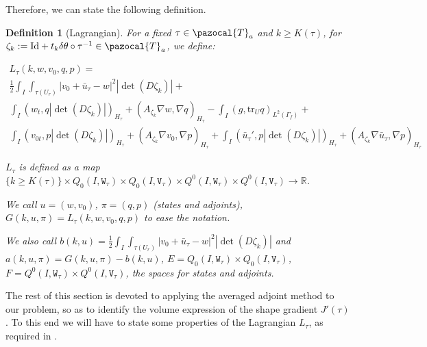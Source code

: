 \documentclass[english,a4paper,10pt,oneside]{scrbook}	%
\theoremstyle{break}
\newtheorem{defn}[equation]{Definition}
\theoremstyle{remark}
\newcommand{\mR}{\mathbb{R}}
\newcommand{\ds}{\displaystyle}
\newcommand{\tr}{\text{tr}}
\newcommand{\cT}{\pazocal{T}}
\newcommand{\id}{\text{Id}}
\newcommand{\te}{\theta}
\newcommand{\tw}[1]{\texttt{#1}}
\begin{document}
Therefore, we can state the following definition.

\begin{defn}[Lagrangian]

For a fixed $\tau \in \cT_a$ and  $k\geq K(\tau)$, for $\zeta_k:=\id+t_k \delta\te \circ \tau^{-1} \in \cT_a$, we define:

\begin{align*}
L_\tau(k,w,v_0,q,p) = \\
\frac{1}{2}\int_I \int_{\tau(U_r)}|v_0+\bar{u}_\tau - w|^2|\det(D\zeta_k)|+\\
\int_I ( w_t , q |\det(D\zeta_k)|)_{H_\tau}+ (A_{\zeta_k}\nabla w, \nabla q)_{H_\tau} -\int_I(g,\tr_{U} q)_{L^2(\Gamma_f)} +\\ \int_I (v_{0t},p |\det(D\zeta_k)|)_{H_\tau} + (A_{\zeta_k} \nabla v_0, \nabla p)_{H_\tau}+\int_I(\bar{u}_\tau',p|\det(D\zeta_k)|)_{H_\tau}+(A_{\zeta_k} \nabla \bar{u}_\tau , \nabla p)_{H_\tau}
\end{align*}

$L_\tau$ is defined as a map $\{k\geq K(\tau)\}\times Q_0(I, \tw{W}_\tau)\times Q_0(I,\tw{V}_\tau)\times Q^0(I, \tw{W}_\tau)\times Q^0(I, \tw{V}_\tau)\rightarrow \mR$.

We call $u = (w,v_0)$, $\pi = (q,p)$ (states and adjoints), $G(k,u,\pi) = L_\tau(k,w,v_0,q,p)$ to ease the notation.

We also call $b(k, u) = \frac{1}{2}\ds\int_I \int_{\tau(U_r)}|v_0+\bar{u}_\tau - w|^2|\det(D\zeta_k)|$ and $a(k, u,\pi) = G(k,u,\pi)-b(k, u)$, $E = Q_0(I, \tw{W}_\tau)\times Q_0(I,\tw{V}_\tau)$, $F=Q^0(I, \tw{W}_\tau)\times Q^0(I, \tw{V}_\tau)$, the spaces for states and adjoints.

\end{defn}

The rest of this section is devoted to applying the averaged adjoint method \cite{avg_adj} to our problem, so as to identify the volume expression of the shape gradient $J'(\tau)$. To this end we will have to state some properties of the Lagrangian $L_\tau $, as required in \cite{avg_adj}.
\end{document}
